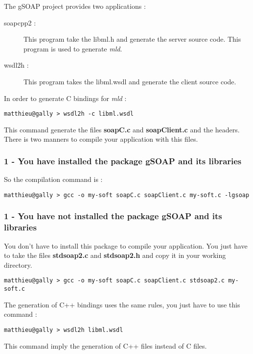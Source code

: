 \noindent The gSOAP project provides two applications :
\begin{description}
\item [soapcpp2 :] This program take the libml.h and generate the server source code. This program
is used to generate \emph{mld}.
\item [wsdl2h :] This program takes the libml.wsdl and generate the client source code.\\
\end{description}

\noindent In order to generate C bindings for \emph{mld} :
\begin{verbatim}
matthieu@gally > wsdl2h -c libml.wsdl
\end{verbatim}

\noindent This command generate the files \textbf{soapC.c} and \textbf{soapClient.c} and the headers.\\

\noindent There is two manners to compile your application with this files.

\subsubsection{1 - You have installed the package gSOAP and its libraries}

\noindent So the compilation command is :
\begin{verbatim}
matthieu@gally > gcc -o my-soft soapC.c soapClient.c my-soft.c -lgsoap
\end{verbatim}

\subsubsection{1 - You have not installed the package gSOAP and its libraries}

\noindent You don't have to install this package to compile your application. You just have
to take the files \textbf{stdsoap2.c} and \textbf{stdsoap2.h} and copy it in your working directory.
\begin{verbatim}
matthieu@gally > gcc -o my-soft soapC.c soapClient.c stdsoap2.c my-soft.c
\end{verbatim}

The generation of C++ bindings uses the same rules, you just have to use this command :
\begin{verbatim}
matthieu@gally > wsdl2h libml.wsdl
\end{verbatim}
This command imply the generation of C++ files instead of C files.\\

